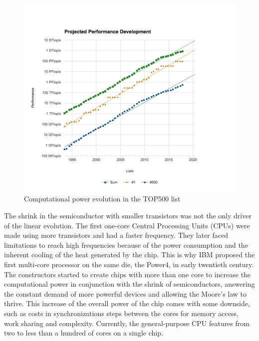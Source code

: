 \begin{figure}
\centering
\includegraphics[width=.85\linewidth]{figures/introduction/top500_list_approximation.png}
\caption{Computational power evolution in the TOP500 list}
\label{fig:intro_top500}
\end{figure}

The shrink in the semiconductor with smaller transistors was not the only driver of the linear evolution.
The first one-core Central Processing Units (CPUs) were made using more transistors and had a faster frequency.
They later faced limitations to reach high frequencies because of the power consumption and the inherent cooling of the heat generated by the chip.
This is why IBM proposed the first multi-core processor on the same die, the Power4, in early twentieth century.
The constructors started to create chips with more than one core to increase the computational power in conjunction with the shrink of semiconductors, answering the constant demand of more powerful devices and allowing the Moore's law to thrive. 
This increase of the overall power of the chip comes with some downside, such as costs in synchronizations steps between the cores for memory access, work sharing and complexity.
Currently, the general-purpose CPU features from two to less than a hundred of cores on a single chip.\\

